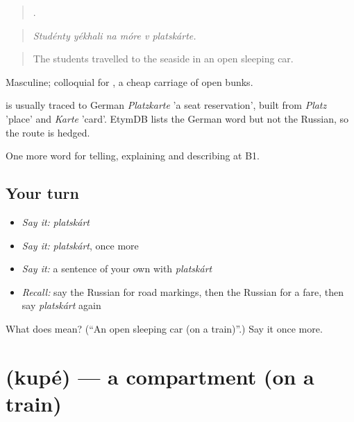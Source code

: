 \begin{quote}
     .
\end{quote}

\begin{quote}
\emph{Studénty yékhali na móre v platskárte.}
\end{quote}

\begin{quote}
The students travelled to the seaside in an open sleeping car.
\end{quote}

Masculine; colloquial for \emph{ }, a cheap carriage of open bunks.

\begin{cousinweb}
\emph{} is usually traced to German \emph{Platzkarte} 'a seat reservation', built from \emph{Platz} 'place' and \emph{Karte} 'card'. EtymDB lists the German word but not the Russian, so the route is hedged.
\end{cousinweb}

\begin{grammarlens}[title={What you've built}]
One more word for telling, explaining and describing at B1.
\end{grammarlens}

\subsection*{Your turn}
\begin{itemize}
\raggedright
  \item \emph{Say it:} \emph{platskárt}
  \item \emph{Say it:} \emph{platskárt}, once more
  \item \emph{Say it:} a sentence of your own with \emph{platskárt}
  \item \emph{Recall:} say the Russian for road markings, then the Russian for a fare, then say \emph{platskárt} again
\end{itemize}

\begin{tcolorbox}[breakable,colback=teal!4,colframe=teal!35!black,title={Before you move on}]
What does  mean? (\textquotedblleft{}An open sleeping car (on a train)\textquotedblright{}.) Say it once more.
\end{tcolorbox}
\section[\texorpdfstring{\ru{купе} (kupé)}{купе (kupé)}]{ (kupé) — a compartment (on a train)}


